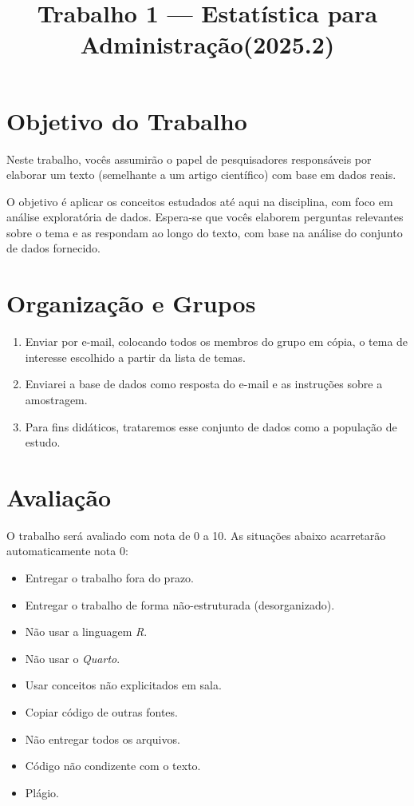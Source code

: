 \documentclass[12pt]{article}
\title{\textbf{Trabalho 1 — Estatística para Administração(2025.2)}}
\author{}
\date{}
\begin{document}
\maketitle
\onehalfspacing

\section*{Objetivo do Trabalho}

Neste trabalho, vocês assumirão o papel de pesquisadores responsáveis por elaborar um texto (semelhante a um artigo científico) com base em dados reais.

O objetivo é aplicar os conceitos estudados até aqui na disciplina, com foco em análise exploratória de dados. Espera-se que vocês elaborem perguntas relevantes sobre o tema e as respondam ao longo do texto, com base na análise do conjunto de dados fornecido.

\section*{Organização e Grupos}

\begin{enumerate}
    \item Enviar por e-mail, colocando todos os membros do grupo em cópia, o tema de interesse escolhido a partir da lista de temas. 
    \item Enviarei a base de dados como resposta do e-mail e as instruções sobre a amostragem. 
    \item Para fins didáticos, trataremos esse conjunto de dados como a população de estudo.
\end{enumerate}

\section*{Avaliação}

O trabalho será avaliado com nota de 0 a 10. As situações abaixo acarretarão automaticamente nota 0:

\begin{itemize}
    \item Entregar o trabalho fora do prazo. 
    \item Entregar o trabalho de forma não-estruturada (desorganizado). 
    \item Não usar a linguagem \textit{R}.
    \item Não usar o \textit{Quarto}.
    \item Usar conceitos não explicitados em sala. 
    \item Copiar código de outras fontes. 
    \item Não entregar todos os arquivos.
    \item Código não condizente com o texto. 
    \item Plágio.
\end{itemize}
\end{document}
